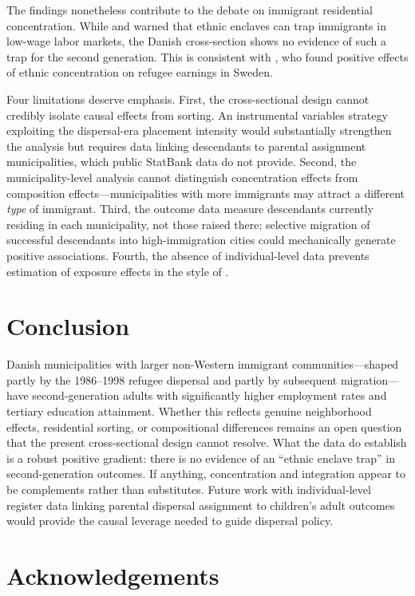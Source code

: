 \documentclass[12pt]{article}
\begin{document}
The findings nonetheless contribute to the debate on immigrant residential concentration. While \citet{cutler1997} and \citet{borjas1995} warned that ethnic enclaves can trap immigrants in low-wage labor markets, the Danish cross-section shows no evidence of such a trap for the second generation. This is consistent with \citet{edin2003}, who found positive effects of ethnic concentration on refugee earnings in Sweden.

Four limitations deserve emphasis. First, the cross-sectional design cannot credibly isolate causal effects from sorting. An instrumental variables strategy exploiting the dispersal-era placement intensity would substantially strengthen the analysis but requires data linking descendants to parental assignment municipalities, which public StatBank data do not provide. Second, the municipality-level analysis cannot distinguish concentration effects from composition effects---municipalities with more immigrants may attract a different \textit{type} of immigrant. Third, the outcome data measure descendants currently residing in each municipality, not those raised there; selective migration of successful descendants into high-immigration cities could mechanically generate positive associations. Fourth, the absence of individual-level data prevents estimation of exposure effects in the style of \citet{chetty2018}.

\section{Conclusion}

Danish municipalities with larger non-Western immigrant communities---shaped partly by the 1986--1998 refugee dispersal and partly by subsequent migration---have second-generation adults with significantly higher employment rates and tertiary education attainment. Whether this reflects genuine neighborhood effects, residential sorting, or compositional differences remains an open question that the present cross-sectional design cannot resolve. What the data do establish is a robust positive gradient: there is no evidence of an ``ethnic enclave trap'' in second-generation outcomes. If anything, concentration and integration appear to be complements rather than substitutes. Future work with individual-level register data linking parental dispersal assignment to children's adult outcomes would provide the causal leverage needed to guide dispersal policy.

\section*{Acknowledgements}
\end{document}
